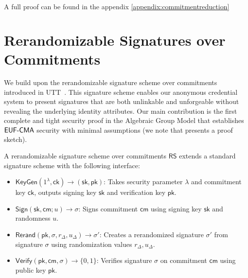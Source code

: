 A full proof can be found in the appendix \ref{appendix:commitmentreduction}
% 
% 















% 
% 
\newpage
\section{Rerandomizable Signatures over Commitments}\label{sec:pssignature}
We build upon the rerandomizable signature scheme over commitments introduced in UTT~\cite{tomescu2022utt}. This signature scheme enables our anonymous credential system to present signatures that are both unlinkable and unforgeable without revealing the underlying identity attributes. Our main contribution is the first complete and tight security proof in the Algebraic Group Model that establishes $\mathsf{EUF\text{-}CMA}$ security with minimal assumptions (we note that \cite{tomescu2022utt} presents a proof sketch).


\begin{definition}
A rerandomizable signature scheme over commitments $\mathsf{RS}$ extends a standard signature scheme with the following interface:
\begin{itemize}
    \item $\mathsf{KeyGen}(1^\lambda, \mathsf{ck}) \rightarrow (\mathsf{sk}, \mathsf{pk})$: Takes security parameter $\lambda$ and commitment key $\mathsf{ck}$, outputs signing key $\mathsf{sk}$ and verification key $\mathsf{pk}$.
    
    \item $\mathsf{Sign}(\mathsf{sk}, \mathsf{cm}; u) \rightarrow \sigma$: Signs commitment $\mathsf{cm}$ using signing key $\mathsf{sk}$ and randomness $u$.
    
    \item $\mathsf{Rerand}(\mathsf{pk}, \sigma, r_\Delta, u_\Delta) \rightarrow \sigma'$: Creates a rerandomized signature $\sigma'$ from signature $\sigma$ using randomization values $r_\Delta, u_\Delta$.
    
    \item $\mathsf{Verify}(\mathsf{pk}, \mathsf{cm}, \sigma) \rightarrow \{0,1\}$: Verifies signature $\sigma$ on commitment $\mathsf{cm}$ using public key $\mathsf{pk}$.
\end{itemize}
\end{definition}

